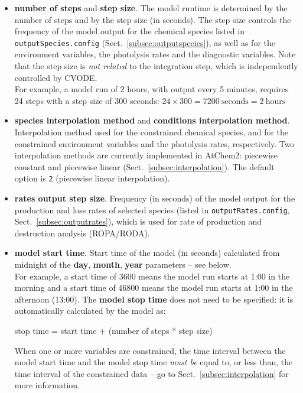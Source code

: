 \begin{itemize}
\item \textbf{number of steps} and \textbf{step size}. The model
  runtime is determined by the number of steps and by the step size
  (in seconds). The step size controls the frequency of the model
  output for the chemical species listed in \texttt{outputSpecies.config}
  (Sect.~\ref{subsec:outputspecies}), as well as for the environment
  variables, the photolysis rates and the diagnostic variables. Note
  that the step size is \emph{not related} to the integration step,
  which is independently controlled by CVODE.\\
  For example, a model run of 2 hours, with output every 5
  minutes, requires 24 steps with a step size of 300 seconds:
  $24 \times 300 = 7200~\mathrm{seconds} = 2~\mathrm{hours}$
\item \textbf{species interpolation method} and
  \textbf{conditions interpolation method}. Interpolation method used
  for the constrained chemical species, and for the constrained environment
  variables and the photolysis rates, respectively. Two interpolation
  methods are currently implemented in AtChem2: piecewise constant and
  piecewise linear (Sect.~\ref{subsec:interpolation}). The default
  option is \texttt{2} (piecewise linear interpolation).
\item \textbf{rates output step size}. Frequency (in seconds) of the
  model output for the production and loss rates of selected species
  (listed in \texttt{outputRates.config}, Sect.~\ref{subsec:outputrates}),
  which is used for rate of production and destruction analysis
  (ROPA/RODA).
\item \textbf{model start time}. Start time of the model (in seconds)
  calculated from midnight of the \textbf{day}, \textbf{month},
  \textbf{year} parameters -- see below.\\
  For example, a start time of 3600 means the model run starts at 1:00
  in the morning and a start time of 46800 means the model run starts
  at 1:00 in the afternoon (13:00). The \textbf{model stop time} does
  not need to be specified: it is automatically calculated by the
  model as:
  \begin{center}
    stop time = start time + (number of steps * step size)
  \end{center}
  When one or more variables are constrained, the time interval
  between the model start time and the model stop time \emph{must be}
  equal to, or less than, the time interval of the constrained data --
  go to Sect.~\ref{subsec:interpolation} for more information.

\end{itemize}
